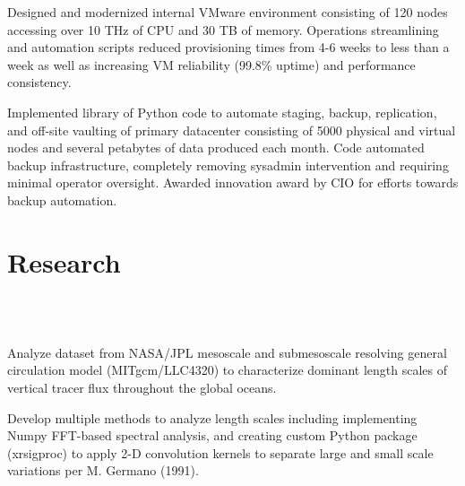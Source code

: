 \documentclass[]{deedy-resume-openfont}
\begin{document}
\begin{minipage}[t]{0.66\textwidth}
\begin{tightemize}
\item Designed and modernized internal VMware environment consisting of 120 nodes accessing over 10 THz of CPU and 30 TB of memory. Operations streamlining and automation scripts reduced provisioning times from 4-6 weeks to less than a week as well as increasing VM reliability (99.8\% uptime) and performance consistency.
\item Implemented library of Python code to automate staging, backup, replication, and off-site vaulting of primary datacenter consisting of 5000 physical and virtual nodes and several petabytes of data produced each month. Code automated backup infrastructure, completely removing sysadmin intervention and requiring minimal operator oversight. Awarded innovation award by CIO for efforts towards backup automation.
\end{tightemize}
\end{minipage}

\newpage

\section{Research}
\\
\\
\begin{tightemize}
    \item Analyze dataset from NASA/JPL mesoscale and submesoscale resolving general circulation model (MITgcm/LLC4320) to characterize dominant length scales of vertical tracer flux throughout the global oceans.
    \item Develop multiple methods to analyze length scales including implementing Numpy FFT-based spectral analysis, and creating custom Python package (xrsigproc) to apply 2-D convolution kernels to separate large and small scale variations per M. Germano (1991).
\end{tightemize}
\sectionsep
\end{document}
